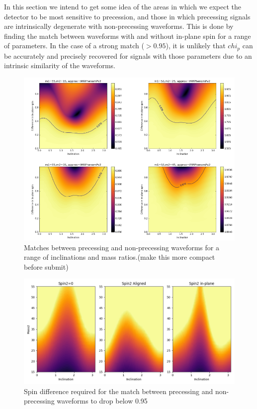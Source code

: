 \documentclass[11pt]{article}
\begin{document}
In this section we intend to get some idea of the areas in which we expect the detector to be most sensitive to precession, and those in which precessing signals are intrinsically degenerate with non-precessing waveforms. This is done by finding the match between waveforms with and without in-plane spin for a range of parameters. In the case of a strong match ($>0.95$), it is unlikely that $chi_p$ can be accurately and precisely recovered for signals with those parameters due to an intrinsic similarity of the waveforms.

\begin{figure}[h]
	\includegraphics[scale=0.55]{fig10.png}
	\centering
	\caption{Matches between precessing and non-precessing waveforms for a range of inclinations and mass ratios.(make this more compact before submit)}
	\centering
\end{figure}
\begin{figure}[h]
	\includegraphics[scale=0.55]{fig11.png}
	\centering
	\caption{Spin difference required for the match between precessing and non-precessing waveforms to drop below 0.95}
	\centering
\end{figure}
\end{document}
